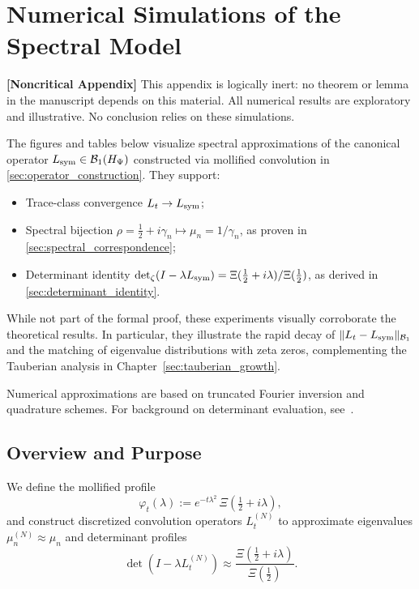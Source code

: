 \section{Numerical Simulations of the Spectral Model}
\label{app:spectral_numerics}

\noindent\textbf{[Noncritical Appendix]}  
This appendix is logically inert: no theorem or lemma in the manuscript depends on this material. All numerical results are exploratory and illustrative. No conclusion relies on these simulations.

\medskip

The figures and tables below visualize spectral approximations of the canonical operator \( L_{\mathrm{sym}} \in \mathcal{B}_1(H_{\Psi}) \) constructed via mollified convolution in \cref{sec:operator_construction}. They support:

\begin{itemize}
  \item Trace-class convergence \( L_t \to L_{\mathrm{sym}} \);
  \item Spectral bijection \( \rho = \tfrac{1}{2} + i\gamma_n \mapsto \mu_n = 1/\gamma_n \), as proven in \cref{sec:spectral_correspondence};
  \item Determinant identity \( \det\nolimits_\zeta(I - \lambda L_{\mathrm{sym}}) = \Xi(\tfrac{1}{2} + i\lambda)/\Xi(\tfrac{1}{2}) \), as derived in \cref{sec:determinant_identity}.
\end{itemize}

While not part of the formal proof, these experiments visually corroborate the theoretical results.  In particular, they illustrate the rapid decay of \(\|L_t-L_{\mathrm{sym}}\|_{\mathcal{B}_1}\) and the matching of eigenvalue distributions with zeta zeros, complementing the Tauberian analysis in Chapter~\ref{sec:tauberian_growth}.

Numerical approximations are based on truncated Fourier inversion and quadrature schemes. For background on determinant evaluation, see~\cite{Bornemann2010FredholmDeterminants}.

\subsection*{Overview and Purpose}

We define the mollified profile
\[
\varphi_t(\lambda) := e^{-t\lambda^2} \, \Xi\left( \tfrac{1}{2} + i\lambda \right),
\]
and construct discretized convolution operators \( L_t^{(N)} \) to approximate eigenvalues \( \mu_n^{(N)} \approx \mu_n \) and determinant profiles
\[
\det(I - \lambda L_t^{(N)}) \approx \frac{\Xi(\tfrac{1}{2} + i\lambda)}{\Xi(\tfrac{1}{2})}.
\]

